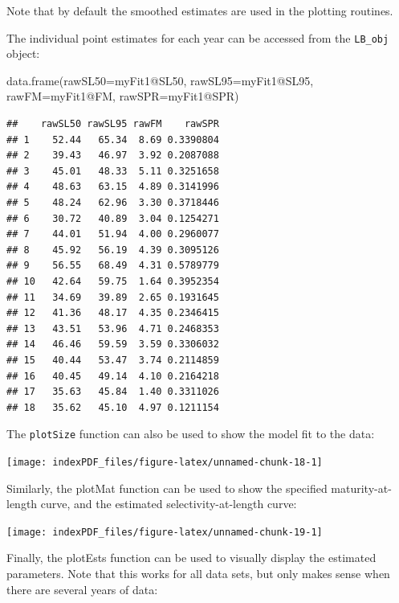 \documentclass[
]{article}
\newenvironment{Shaded}{\begin{snugshade}}{\end{snugshade}}
\newcommand{\AttributeTok}[1]{\textcolor[rgb]{0.77,0.63,0.00}{#1}}
\newcommand{\FunctionTok}[1]{\textcolor[rgb]{0.00,0.00,0.00}{#1}}
\newcommand{\NormalTok}[1]{#1}
\newcommand{\SpecialCharTok}[1]{\textcolor[rgb]{0.00,0.00,0.00}{#1}}
\begin{document}
Note that by default the smoothed estimates are used in the plotting
routines.

The individual point estimates for each year can be accessed from the
\texttt{LB\_obj} object:

\begin{Shaded}
\begin{Highlighting}[]
\FunctionTok{data.frame}\NormalTok{(}\AttributeTok{rawSL50=}\NormalTok{myFit1}\SpecialCharTok{@}\NormalTok{SL50, }\AttributeTok{rawSL95=}\NormalTok{myFit1}\SpecialCharTok{@}\NormalTok{SL95, }\AttributeTok{rawFM=}\NormalTok{myFit1}\SpecialCharTok{@}\NormalTok{FM, }\AttributeTok{rawSPR=}\NormalTok{myFit1}\SpecialCharTok{@}\NormalTok{SPR)}
\end{Highlighting}
\end{Shaded}

\begin{verbatim}
##    rawSL50 rawSL95 rawFM    rawSPR
## 1    52.44   65.34  8.69 0.3390804
## 2    39.43   46.97  3.92 0.2087088
## 3    45.01   48.33  5.11 0.3251658
## 4    48.63   63.15  4.89 0.3141996
## 5    48.24   62.96  3.30 0.3718446
## 6    30.72   40.89  3.04 0.1254271
## 7    44.01   51.94  4.00 0.2960077
## 8    45.92   56.19  4.39 0.3095126
## 9    56.55   68.49  4.31 0.5789779
## 10   42.64   59.75  1.64 0.3952354
## 11   34.69   39.89  2.65 0.1931645
## 12   41.36   48.17  4.35 0.2346415
## 13   43.51   53.96  4.71 0.2468353
## 14   46.46   59.59  3.59 0.3306032
## 15   40.44   53.47  3.74 0.2114859
## 16   40.45   49.14  4.10 0.2164218
## 17   35.63   45.84  1.40 0.3311026
## 18   35.62   45.10  4.97 0.1211154
\end{verbatim}

The \texttt{plotSize} function can also be used to show the model fit to
the data:

\begin{center}\texttt{[image: indexPDF\_files/figure-latex/unnamed-chunk-18-1]} \end{center}

Similarly, the plotMat function can be used to show the specified
maturity-at-length curve, and the estimated selectivity-at-length curve:

\begin{center}\texttt{[image: indexPDF\_files/figure-latex/unnamed-chunk-19-1]} \end{center}

Finally, the plotEsts function can be used to visually display the
estimated parameters. Note that this works for all data sets, but only
makes sense when there are several years of data:
\end{document}
